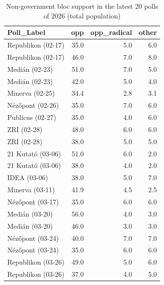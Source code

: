 \begin{table}
\caption{Non-government bloc support in the latest 20 polls of 2026 (total population)}
\label{tab:poll_blocks_2026_latest20}
\begin{tabular}{lrrr}
\toprule
Poll_Label & opp & opp_radical & other \\
\midrule
Republikon (02-17) & 35.0 & 5.0 & 6.0 \\
Republikon (02-17) & 46.0 & 7.0 & 8.0 \\
Medián (02-23) & 51.0 & 7.0 & 5.0 \\
Medián (02-23) & 42.0 & 5.0 & 4.0 \\
Minerva (02-25) & 34.4 & 2.8 & 3.1 \\
Nézőpont (02-26) & 35.0 & 7.0 & 6.0 \\
Publicus (02-27) & 35.0 & 4.0 & 6.0 \\
ZRI (02-28) & 48.0 & 6.0 & 6.0 \\
ZRI (02-28) & 38.0 & 5.0 & 5.0 \\
21 Kutató (03-06) & 51.0 & 6.0 & 2.0 \\
21 Kutató (03-06) & 38.0 & 4.0 & 2.0 \\
IDEA (03-06) & 38.0 & 5.0 & 7.0 \\
Minerva (03-11) & 41.9 & 4.5 & 2.5 \\
Nézőpont (03-17) & 35.0 & 6.0 & 6.0 \\
Medián (03-20) & 56.0 & 4.0 & 3.0 \\
Medián (03-20) & 46.0 & 3.0 & 3.0 \\
Nézőpont (03-24) & 40.0 & 7.0 & 7.0 \\
Nézőpont (03-24) & 35.0 & 6.0 & 6.0 \\
Republikon (03-26) & 49.0 & 5.0 & 6.0 \\
Republikon (03-26) & 37.0 & 4.0 & 5.0 \\
\bottomrule
\end{tabular}
\end{table}
